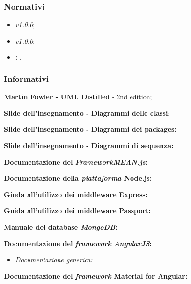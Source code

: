 \subsubsection{Normativi}
\begin{itemize}
	\item \textit{\NdP v1.0.0};
	\item \textit{\AdR v1.0.0};
	\item \textbf{\VE: }.
\end{itemize}
\subsubsection{Informativi}
	\item \textbf{Martin Fowler - UML Distilled} - 2nd edition;
	\item \textbf{Slide dell'insegnamento - Diagrammi delle classi}:
	\item \textbf{Slide dell'insegnamento - Diagrammi dei packages:}
	\item \textbf{Slide dell'insegnamento - Diagrammi di sequenza:}
	\item \textbf{Documentazione del \textit{FrameworkMEAN.js}:}
	\item \textbf{Documentazione della \textit{piattaforma} Node.js:}
	\item \textbf{Giuda all'utilizzo dei middleware Express:}
	\item \textbf{Guida all'utilizzo dei middleware Passport:}
	\item \textbf{Manuale del database \textit{MongoDB}:}
	\item \textbf{Documentazione del \textit{framework AngularJS}:}
	\begin{itemize}
		\item \textit{Documentazione generica:}
	\end{itemize}
	\item \textbf{Documentazione del \textit{framework} Material for Angular:}
